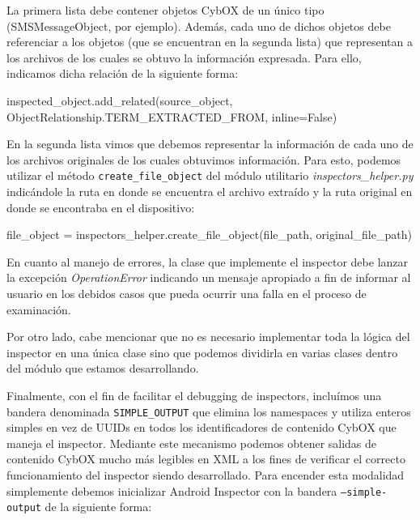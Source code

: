 La primera lista debe contener objetos CybOX de un único tipo (SMSMessageObject, por ejemplo). Además, cada uno de dichos objetos debe referenciar a los objetos (que se encuentran en la segunda lista) que representan a los archivos de los cuales se obtuvo la información expresada. Para ello, indicamos dicha relación de la siguiente forma:
\newline

\begin{python}
inspected_object.add_related(source_object,
                             ObjectRelationship.TERM_EXTRACTED_FROM,
                             inline=False)
\end{python}

En la segunda lista vimos que debemos representar la información de cada uno de los archivos originales de los cuales obtuvimos información. Para esto, podemos utilizar el método \texttt{create\_file\_object} del módulo utilitario \emph{inspectors\_helper.py} indicándole la ruta en donde se encuentra el archivo extraído y la ruta original en donde se encontraba en el dispositivo:
\newline

\begin{python}
file_object = inspectors_helper.create_file_object(file_path,
                                                   original_file_path)
\end{python}

En cuanto al manejo de errores, la clase que implemente el inspector debe lanzar la excepción \emph{OperationError} indicando un mensaje apropiado a fin de informar al usuario en los debidos casos que pueda ocurrir una falla en el proceso de examinación.

Por otro lado, cabe mencionar que no es necesario implementar toda la lógica del inspector en una única clase sino que podemos dividirla en varias clases dentro del módulo que estamos desarrollando.

Finalmente, con el fin de facilitar el debugging de inspectors, incluímos una bandera denominada \texttt{SIMPLE\_OUTPUT} que elimina los namespaces y utiliza enteros simples en vez de UUIDs en todos los identificadores de contenido CybOX que maneja el inspector. Mediante este mecanismo podemos obtener salidas de contenido CybOX mucho más legibles en XML a los fines de verificar el correcto funcionamiento del inspector siendo desarrollado. Para encender esta modalidad simplemente debemos inicializar Android Inspector con la bandera \texttt{--simple-output} de la siguiente forma:
\newline


